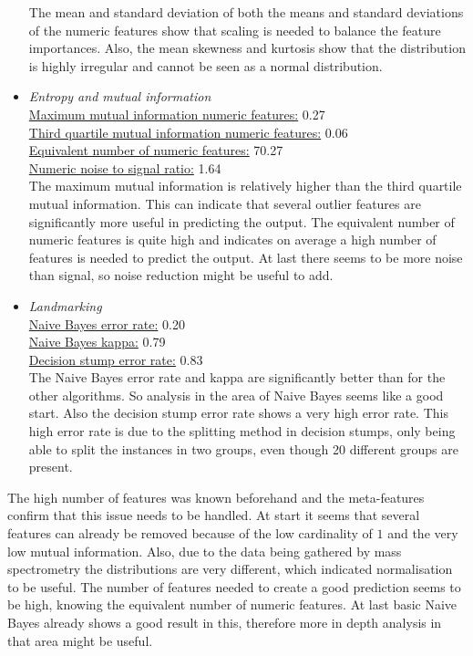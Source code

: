 \documentclass[10pt,a4paper]{report}
\begin{document}
\begin{itemize}
		The mean and standard deviation of both the means and standard deviations of the numeric features show that scaling is needed to balance the feature importances. Also, the mean skewness and kurtosis show that the distribution is highly irregular and cannot be seen as a normal distribution.
		
		\item \textit{Entropy and mutual information} \\
		\underline{Maximum mutual information numeric features:} 0.27 \\
		\underline{Third quartile mutual information numeric features:} 0.06 \\
		\underline{Equivalent number of numeric features:} 70.27 \\
		\underline{Numeric noise to signal ratio:} 1.64 \\
		
		The maximum mutual information is relatively higher than the third quartile mutual information. This can indicate that several outlier features are significantly more useful in predicting the output. The equivalent number of numeric features is quite high and indicates on average a high number of features is needed to predict the output. At last there seems to be more noise than signal, so noise reduction might be useful to add.
		
		\item \textit{Landmarking} \\
		\underline{Naive Bayes error rate:} 0.20 \\
		\underline{Naive Bayes kappa:} 0.79 \\
		\underline{Decision stump error rate:} 0.83 \\		
		
		The Naive Bayes error rate and kappa are significantly better than for the other algorithms. So analysis in the area of Naive Bayes seems like a good start. Also the decision stump error rate shows a very high error rate. This high error rate is due to the splitting method in decision stumps, only being able to split the instances in two groups, even though 20 different groups are present.
	\end{itemize}
	
	The high number of features was known beforehand and the meta-features confirm that this issue needs to be handled. At start it seems that several features can already be removed because of the low cardinality of $1$ and the very low mutual information. Also, due to the data being gathered by mass spectrometry the distributions are very different, which indicated normalisation to be useful. The number of features needed to create a good prediction seems to be high, knowing the equivalent number of numeric features. At last basic Naive Bayes already shows a good result in this, therefore more in depth analysis in that area might be useful.
	
\end{document}

